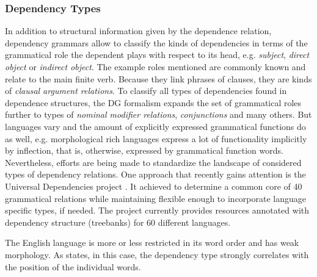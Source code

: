 \subsubsection{Dependency Types}
In addition to structural  information given by the dependence relation, dependency grammars allow to classify the kinds of dependencies in terms of the grammatical role the dependent plays with respect to its head, e.g. \textit{subject}, \textit{direct object} or \textit{indirect object}. The example roles mentioned are commonly known and relate to the main finite verb. Because they link phrases of clauses, they are kinds of \textit{clausal argument relations}. To classify all types of dependencies found in dependence structures, the \ac{DG} formalism expands the set of grammatical roles further to types of \textit{nominal modifier relations}, \textit{conjunctions} and many others. But languages vary and the amount of explicitly expressed grammatical functions do as well, e.g. morphological rich languages express a lot of functionality implicitly by inflection, that is, otherwise, expressed by grammatical function words. Nevertheless, efforts are being made to standardize the landscape of considered types of dependency relations. One approach that recently gains attention is the Universal Dependencies project \autocite{nivre_universal_2016}. It achieved to determine a common core of 40 grammatical relations while maintaining flexible enough to incorporate language specific types, if needed. The project currently provides resources annotated with dependency structure (treebanks) for 60 different languages.

The English language is more or less restricted in its word order and has weak morphology. As \textcite{jurafsky_dependency_2014} states, in this case, the dependency type strongly correlates with the position of the individual words.



